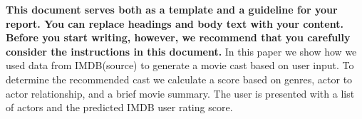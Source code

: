 \textbf{This document serves both as a template and a guideline for your report. You can replace headings and body text with your content. Before you start writing, however, we recommend that you carefully consider the instructions in this document.
}
In this paper we show how we used data from IMDB(source) to generate a movie cast based on user input. To determine the 
recommended cast we calculate a score based on genres, actor to actor relationship, and a brief movie summary. The user
is presented with a list of actors and the predicted IMDB user rating score.